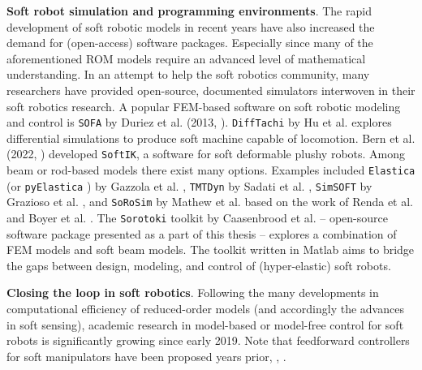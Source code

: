 \textbf{Soft robot simulation and programming environments}. 
%
The rapid development of soft robotic models in recent years have also increased the demand for (open-access) software packages. Especially since many of the aforementioned ROM models require an advanced level of mathematical understanding. In an attempt to help the soft robotics community, many researchers have provided open-source, documented simulators interwoven in their soft robotics research. A popular FEM-based software on soft robotic modeling and control is \texttt{SOFA} by Duriez et al. (2013, \cite{Duriez2013,Coevoet2017}). \texttt{DiffTachi} by Hu et al. \cite{Hu2019taichi, Hu2019Oct} explores differential simulations to produce soft machine capable of locomotion. Bern et al. (2022, \cite{Bern2022,Bern2019}) developed \texttt{SoftIK}, a software for soft deformable plushy robots. Among beam or rod-based models there exist many options. Examples included \texttt{Elastica} (or \texttt{pyElastica} \cite{Tekinalp2022}) by Gazzola et al. \cite{Gazzola2018,Zhang2019}, \texttt{TMTDyn} by Sadati et al. \cite{Sadati2020}, \texttt{SimSOFT} by Grazioso et al. \cite{Grazioso2019}, and \texttt{SoRoSim} by Mathew et al. \cite{Mathew2021Jul} based on the work of Renda et al. \cite{Renda2020} and Boyer et al. \cite{Boyer2021}. The \texttt{Sorotoki} toolkit by Caasenbrood et al. \cite{SorotokiCode}  -- open-source software package presented as a part of this thesis  -- explores a combination of FEM models and soft beam models. The toolkit written in Matlab aims to bridge the gaps between design, modeling, and control of (hyper-elastic) soft robots.

\textbf{Closing the loop in soft robotics}. Following the many developments in computational efficiency of reduced-order models (and accordingly the advances in soft sensing), academic research in model-based or model-free control for soft robots is significantly growing since early 2019. Note that feedforward controllers for soft manipulators have been proposed years prior, \eg, \cite{Falkenhahn2015May,Falkenhahn2015,Thuruthel2017Oct,Satheeshbabu2019May}. 

